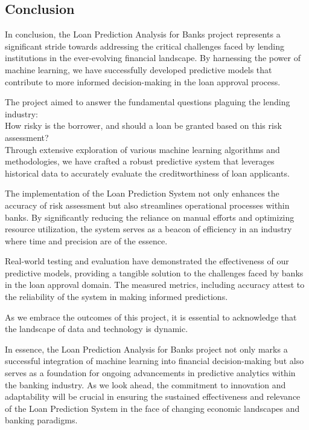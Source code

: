 \documentclass[10pt]{article}
\begin{document}
\subsection*{Conclusion}
In conclusion, the Loan Prediction Analysis for Banks project represents a significant stride towards addressing the critical challenges faced by lending institutions in the ever-evolving financial landscape. By harnessing the power of machine learning, we have successfully developed predictive models that contribute to more informed decision-making in the loan approval process.

The project aimed to answer the fundamental questions plaguing the lending industry:\\ 
How risky is the borrower, and should a loan be granted based on this risk assessment?\\
Through extensive exploration of various machine learning algorithms and methodologies, we have crafted a robust predictive system that leverages historical data to accurately evaluate the creditworthiness of loan applicants.

The implementation of the Loan Prediction System not only enhances the accuracy of risk assessment but also streamlines operational processes within banks. By significantly reducing the reliance on manual efforts and optimizing resource utilization, the system serves as a beacon of efficiency in an industry where time and precision are of the essence.

Real-world testing and evaluation have demonstrated the effectiveness of our predictive models, providing a tangible solution to the challenges faced by banks in the loan approval domain. The measured metrics, including accuracy attest to the reliability of the system in making informed predictions.

As we embrace the outcomes of this project, it is essential to acknowledge that the landscape of data and technology is dynamic.

In essence, the Loan Prediction Analysis for Banks project not only marks a successful integration of machine learning into financial decision-making but also serves as a foundation for ongoing advancements in predictive analytics within the banking industry. As we look ahead, the commitment to innovation and adaptability will be crucial in ensuring the sustained effectiveness and relevance of the Loan Prediction System in the face of changing economic landscapes and banking paradigms.
\end{document}
